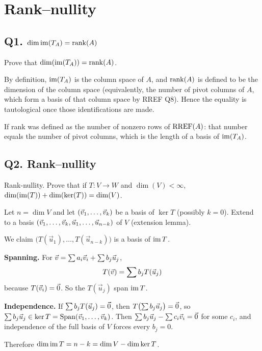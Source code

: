 \section{Rank--nullity}

\subsection{Q1. $\dim\operatorname{im}(T_A)=\operatorname{rank}(A)$}

\begin{promptbox}
Prove that $\dim(\operatorname{im}(T_A))=\operatorname{rank}(A)$.
\end{promptbox}

\begin{coursebox}
By definition, $\operatorname{im}(T_A)$ is the column space of $A$, and $\operatorname{rank}(A)$ is defined
to be the dimension of the column space (equivalently, the number of pivot
columns of $A$, which form a basis of that column space by RREF Q8). Hence the
equality is tautological once those identifications are made.

If rank was defined as the number of nonzero rows of $\operatorname{RREF}(A)$: that number
equals the number of pivot columns, which is the length of a basis of
$\operatorname{im}(T_A)$.
\end{coursebox}

\subsection{Q2. Rank--nullity}

\begin{promptbox}
Rank-nullity. Prove that if $T:V\to W$ and $\dim(V)<\infty$,
$\dim(\operatorname{im}(T))+\dim(\ker(T))=\dim(V)$.
\end{promptbox}

\begin{coursebox}
Let $n=\dim V$ and let $(\vec{v}_1,\ldots,\vec{v}_k)$ be a basis of $\ker T$
(possibly $k=0$). Extend to a basis
$(\vec{v}_1,\ldots,\vec{v}_k,\vec{u}_1,\ldots,\vec{u}_{n-k})$ of $V$ (extension lemma).

We claim $\bigl(T(\vec{u}_1),\ldots,T(\vec{u}_{n-k})\bigr)$ is a basis of
$\operatorname{im} T$.

\textbf{Spanning.}
For $\vec{v}=\sum a_i\vec{v}_i+\sum b_j\vec{u}_j$,
\[
T(\vec{v})=\sum b_j T(\vec{u}_j)
\]
because $T(\vec{v}_i)=\vec{0}$. So the $T(\vec{u}_j)$ span $\operatorname{im} T$.

\textbf{Independence.}
If $\sum b_j T(\vec{u}_j)=\vec{0}$, then $T\bigl(\sum b_j\vec{u}_j\bigr)=\vec{0}$,
so $\sum b_j\vec{u}_j\in\ker T=\operatorname{Span}(\vec{v}_1,\ldots,\vec{v}_k)$. Then
$\sum b_j\vec{u}_j-\sum c_i\vec{v}_i=\vec{0}$ for some $c_i$, and independence of the
full basis of $V$ forces every $b_j=0$.

Therefore $\dim\operatorname{im} T=n-k=\dim V-\dim\ker T$.
\end{coursebox}


